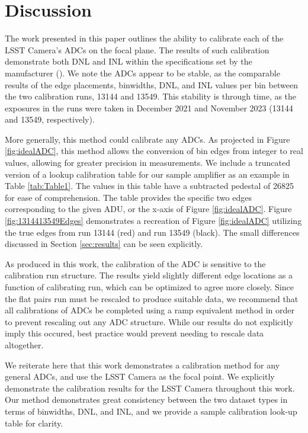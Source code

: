 \documentclass[linenumbers]{aastex7}
\begin{document}
\section{Discussion}
\label{sec:Future}

The work presented in this paper outlines the ability to calibrate each of the LSST Camera's ADCs on the focal plane.
The results of such calibration demonstrate both DNL and INL within the specifications set by the manufacturer (\cite{AnalogDevices}).
We note the ADCs appear to be stable, as the comparable results of the edge placements, binwidths, DNL, and INL values per bin between the two calibration runs, 13144 and 13549. 
This stability is through time, as  the exposures in the runs were taken in December 2021 and November 2023 (13144 and 13549, respectively).

More generally, this method could calibrate any ADCs. 
As projected in Figure \ref{fig:idealADC}, this method allows the conversion of bin edges from integer to real values, allowing for greater precision in measurements.
We include a truncated version of a lookup calibration table for our sample amplifier as an example in Table \ref{tab:Table1}.
The values in this table have a subtracted pedestal of 26825 for ease of comprehension.
The table provides the specific two edges corresponding to the given ADU, or the x-axis of Figure \ref{fig:idealADC}.
Figure \ref{fig:1314413549Edges} demonstrates a recreation of Figure \ref{fig:idealADC} utilizing the true edges from run 13144 (red) and run 13549 (black). 
The small differences discussed in Section \ref{sec:results} can be seen explicitly. 

As produced in this work, the calibration of the ADC is sensitive to the calibration run structure. 
The results yield slightly different edge locations as a function of calibrating run, which can be optimized to agree more closely. 
Since the flat pairs run must be rescaled to produce suitable data, we recommend that all calibrations of ADCs be completed using a ramp equivalent method in order to prevent rescaling out any ADC structure. 
While our results do not explicitly imply this occured, best practice would prevent needing to rescale data altogether.  

We reiterate here that this work demonstrates a calibration method for any general ADCs, and use the LSST Camera as the focal point.
We explicitly demonstrate the calibration results for the LSST Camera throughout this work.
Our method demonstrates great consistency between the two dataset types in terms of binwidths, DNL, and INL, and we provide a sample calibration look-up table for clarity. 
\end{document}
